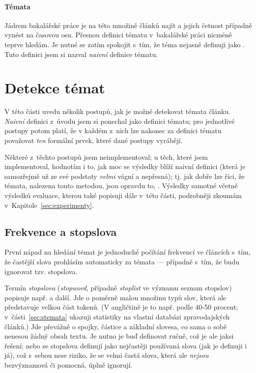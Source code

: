 \documentclass[12pt,a4paper]{report}
\begin{document}

\subsubsection{Témata}
\label{sec:sub_temata}
Jádrem bakalářské práce je na této množině článků najít  a jejich četnost případně vynést na časovou osu. Přesnou definici tématu v~bakalářské práci nicméně teprve hledám. Je nutné se zatím spokojit s~tím, že téma nejasně definuji jako . Tuto definici jsem si nazval \emph{naivní} definice tématu.


\chapter{Detekce témat}
\label{sec:hledanitemat_hlavni}
V této části uvedu několik postupů, jak je možné detekovat témata článku. \emph{Naivní} definici z~úvodu jsem si ponechal jako  definici tématu; pro jednotlivé postupy potom platí, že v každém z~nich lze nakonec za definici tématu považovat \emph{ten} formální prvek, které dané postupy vyrábějí. 

Některé z~těchto postupů jsem neimplementoval; u těch, které jsem implementoval, hodnotím i to, jak moc se výsledky blíží naivní definici (která je samozřejmě už ze své podstaty \emph{velmi} vágní a nepřesná); tj. jak dobře lze říci, že témata, nalezena touto metodou, jsou opravdu to, . Výsledky samotné včetně výsledků evaluace, kterou také popisuji dále v~této části, podrobněji zkoumám v~Kapitole~\ref{sec:experimenty}.

\section{Frekvence a stopslova}
\label{sec:frekvestopslo}

První nápad na hledání témat je jednoduché počítání frekvencí ve článcích s~tím, že častější slova prohlásím automaticky za témata --- případně s~tím, že budu ignorovat tzv. stopslova.

Termín \emph{stopslova} (\emph{stopword}, případně \emph{stoplist} ve významu seznam stopslov) popisuje např. \cite{introduction} a další. Jde o po\-mě\-r\-ně ma\-lou mno\-ži\-nu ty\-pů slov, kte\-rá ale před\-sta\-vu\-je vel\-kou část to\-ke\-nů. (V angličtině je to např. po\-dle \cite{introduction} 40-50 pro\-cent; v~části~\ref{sec:stemata} ukazuji statistiky na vlastní databázi zpravodajských článků.) Jde převážně o spojky, částice a zá\-klad\-ní slovesa, co sama o sobě nenesou žádný obsah textu. Je nutno je buď definovat ručně, což je ale jaksi  řešení; nebo se stopslova definují jako nej\-čas\-tě\-ji po\-u\-ží\-va\-ná slo\-va (jak je definuji i já), což s~sebou ne\-se ri\-zi\-ko, že se vel\-mi čas\-tá slo\-va, kte\-rá ale \emph{ne\-jsou} bez\-vý\-zna\-mo\-vá či po\-moc\-ná, ú\-pl\-ně i\-gno\-ru\-jí.
\end{document}
